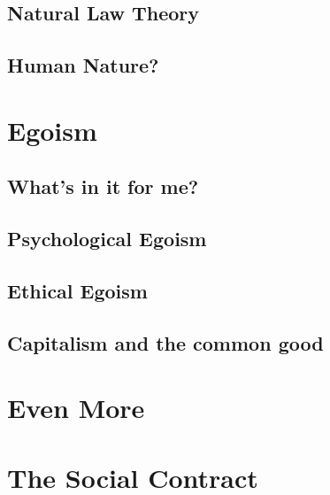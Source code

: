 \documentclass[justified]{tufte-book}
\begin{document}
\hypertarget{natural-law-theory}{%
\section{Natural Law Theory}\label{natural-law-theory}}

\hypertarget{human-nature}{%
\section{Human Nature?}\label{human-nature}}

\hypertarget{egoism}{%
\chapter{Egoism}\label{egoism}}

\hypertarget{whats-in-it-for-me}{%
\section{What's in it for me?}\label{whats-in-it-for-me}}

\hypertarget{psychological-egoism}{%
\section{Psychological Egoism}\label{psychological-egoism}}

\hypertarget{ethical-egoism}{%
\section{Ethical Egoism}\label{ethical-egoism}}

\hypertarget{capitalism-and-the-common-good}{%
\section{Capitalism and the common good}\label{capitalism-and-the-common-good}}

\hypertarget{even-more}{%
\chapter*{Even More}\label{even-more}}

\hypertarget{the-social-contract}{%
\chapter{The Social Contract}\label{the-social-contract}}
\end{document}
